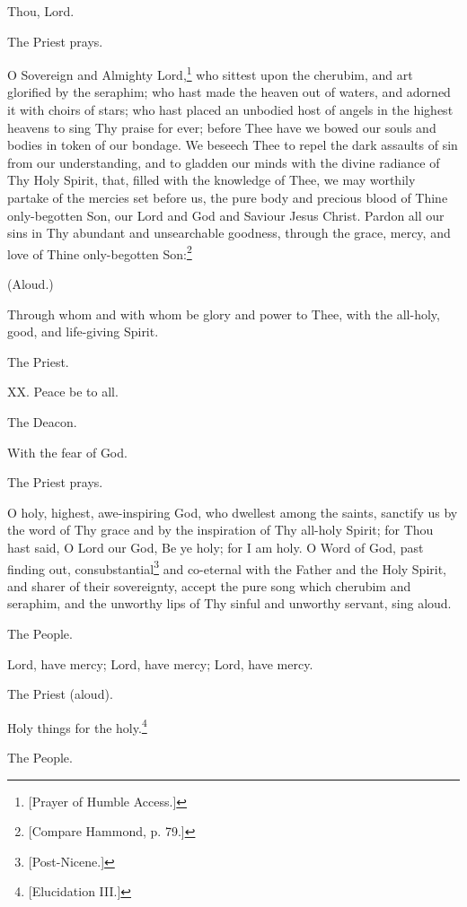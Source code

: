 Thou, Lord.

The Priest prays.

O Sovereign and Almighty Lord,\footnote{\par{}  [Prayer of Humble Access.]} who sittest upon the cherubim, and art glorified by the seraphim; who hast made the heaven out of waters, and adorned it with choirs of stars; who hast placed an unbodied host of angels in the highest heavens to sing Thy praise for ever; before Thee have we bowed our souls and bodies in token of our bondage. We beseech Thee to repel the dark assaults of sin from our understanding, and to gladden our minds with the divine radiance of Thy Holy Spirit, that, filled with the knowledge of Thee, we may worthily partake of the mercies set before us, the pure body and precious blood of Thine only-begotten Son, our Lord and God and Saviour Jesus Christ. Pardon all our sins in Thy abundant and unsearchable goodness, through the grace, mercy, and love of Thine only-begotten Son:\footnote{\par{}  [Compare Hammond, p. 79.]}

(Aloud.)

Through whom and with whom be glory and power to Thee, with the all-holy, good, and life-giving Spirit.

The Priest.

XX. Peace be to all.

The Deacon.

With the fear of God.

The Priest prays.

O holy, highest, awe-inspiring God, who dwellest among the saints, sanctify us by the word of Thy grace and by the inspiration of Thy all-holy Spirit; for Thou hast said, O Lord our God, Be ye holy; for I am holy. O Word of God, past finding out, consubstantial\footnote{\par{}  [Post-Nicene.]} and co-eternal with the Father and the Holy Spirit, and sharer of their sovereignty, accept the pure song which cherubim and seraphim, and the unworthy lips of Thy sinful and unworthy servant, sing aloud.

The People.

Lord, have mercy; Lord, have mercy; Lord, have mercy.

The Priest (aloud).

Holy things for the holy.\footnote{\par{}  [Elucidation III.]}

The People.

